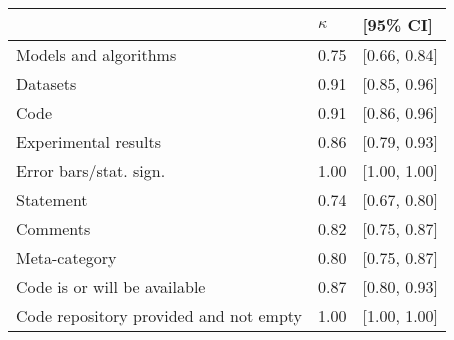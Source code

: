 \begin{tabular}{lll}
\hline
& $\kappa$ & [95\% CI]\\
\hline
Models and algorithms & 0.75 & [0.66, 0.84]  \\
Datasets & 0.91 & [0.85, 0.96]  \\
Code & 0.91 & [0.86, 0.96]  \\
Experimental results & 0.86 & [0.79, 0.93]  \\
Error bars/stat. sign.& 1.00 & [1.00, 1.00]  \\
Statement & 0.74 & [0.67, 0.80]  \\
Comments & 0.82  & [0.75, 0.87]  \\
Meta-category & 0.80  & [0.75, 0.87]  \\
Code is or will be available & 0.87 & [0.80, 0.93]  \\
Code repository provided and not empty & 1.00 & [1.00, 1.00]  \\
\hline
\end{tabular}
